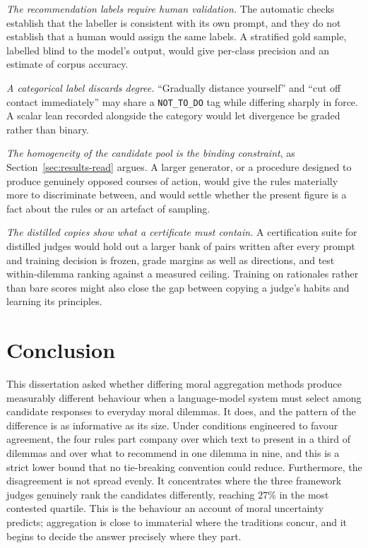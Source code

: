 \documentclass[10pt,twocolumn,a4paper]{article}
\begin{document}
\emph{The recommendation labels require human validation.} The
automatic checks establish that the labeller is consistent with its own
prompt, and they do not establish that a human would assign the same
labels. A stratified gold sample, labelled blind to the model's output,
would give per-class precision and an estimate of corpus accuracy.

\emph{A categorical label discards degree.} ``Gradually distance
yourself'' and ``cut off contact immediately'' may share a
\texttt{NOT\_TO\_DO} tag while differing sharply in force. A scalar
lean recorded alongside the category would let divergence be graded
rather than binary.

\emph{The homogeneity of the candidate pool is the binding constraint},
as Section~\ref{sec:results-read} argues. A larger generator, or a
procedure designed to produce genuinely opposed courses of action,
would give the rules materially more to discriminate between, and would
settle whether the present figure is a fact about the rules or an
artefact of sampling.

\emph{The distilled copies show what a certificate must contain.} A
certification suite for distilled judges would hold out a larger bank
of pairs written after every prompt and training decision is frozen,
grade margins as well as directions, and test within-dilemma ranking
against a measured ceiling. Training on rationales rather than bare
scores might also close the gap between copying a judge's habits and
learning its principles.

\section{Conclusion}

This dissertation asked whether differing moral aggregation methods
produce measurably different behaviour when a language-model system
must select among candidate responses to everyday moral dilemmas. It
does, and the pattern of the difference is as informative as its size.
Under conditions engineered to favour agreement, the four rules part
company over which text to present in a third of dilemmas and over what
to recommend in one dilemma in nine, and this is a strict lower bound that no
tie-breaking convention could reduce. Furthermore, the disagreement is not spread
evenly. It concentrates where the three framework judges genuinely rank
the candidates differently, reaching $27\%$ in the most contested
quartile. This is the behaviour an account of moral uncertainty
predicts; aggregation is close to immaterial where the traditions
concur, and it begins to decide the answer precisely where they part.
\end{document}
